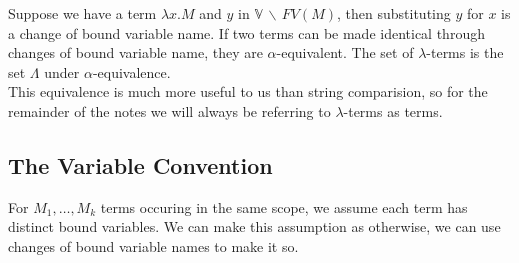 Suppose we have a term $\lambda x.M$ and $y$ in $\mathbb{V} \, \backslash \, FV(M)$,
then substituting $y$ for $x$ is a change of bound variable name. If two terms
can be made identical through changes of bound variable name, they are
$\alpha$-equivalent. The set of $\lambda$-terms is the set $\Lambda$ under
$\alpha$-equivalence.
\\[\baselineskip]
This equivalence is much more useful to us than string comparision, so for the
remainder of the notes we will always be referring to $\lambda$-terms as terms.

\subsection{The Variable Convention}

For $M_1, \ldots, M_k$ terms occuring in the same scope, we assume each term
has distinct bound variables. We can make this assumption as otherwise, we
can use changes of bound variable names to make it so.
